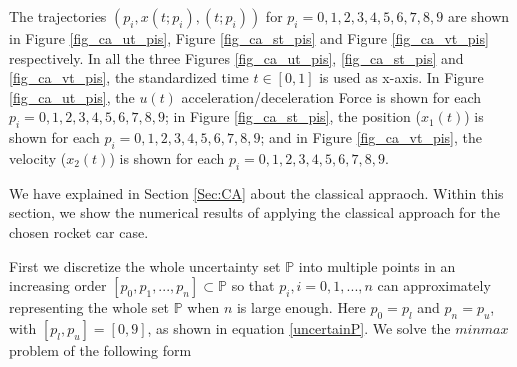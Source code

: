 The trajectories $(p_i, x(t;p_i), (t;p_i))$ for $p_i=0, 1, 2, 3, 4, 5, 6, 7, 8, 9$ are shown in Figure \ref{fig_ca_ut_pis}, Figure \ref{fig_ca_st_pis} and Figure \ref{fig_ca_vt_pis} respectively. In all the three Figures \ref{fig_ca_ut_pis}, \ref{fig_ca_st_pis} and \ref{fig_ca_vt_pis}, the standardized time $t \in [0,1]$ is used as x-axis. In Figure \ref{fig_ca_ut_pis}, the $u(t)$ acceleration/deceleration Force is shown for each $p_i=0, 1, 2, 3, 4, 5, 6, 7, 8, 9$; in Figure \ref{fig_ca_st_pis}, the position ($x_1(t)$) is shown for each $p_i=0, 1, 2, 3, 4, 5, 6, 7, 8, 9$; and in Figure \ref{fig_ca_vt_pis}, the velocity ($x_2(t)$) is shown for each $p_i=0, 1, 2, 3, 4, 5, 6, 7, 8, 9$. 

We have explained in Section \ref{Sec:CA} about the classical appraoch. Within this section, we show the numerical results of applying the classical approach for the chosen rocket car case. 

First we discretize the whole uncertainty set  $\mathbb{P}$ into multiple points in an increasing order $[p_0, p_1, ..., p_n] \subset \mathbb{P}$ so that $p_i, i =0, 1, ..., n$ can approximately representing the whole set $\mathbb{P}$ when $n$ is large enough. Here $p_0=p_l$ and $p_n= p_u$, with $[p_l, p_u] =[0,9]$, as shown in equation \ref{uncertainP}.  We solve the $minmax$ problem of the following form




